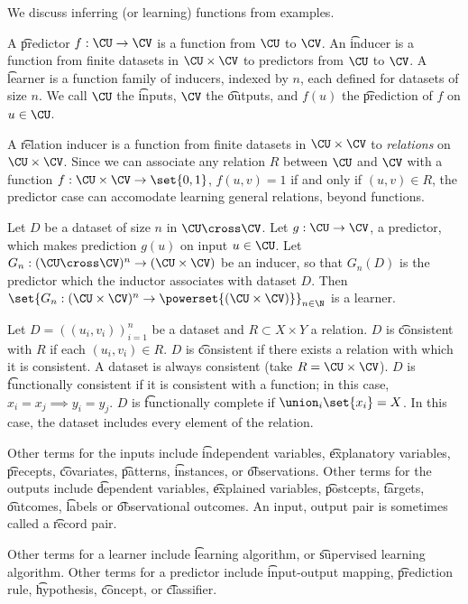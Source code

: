 
We discuss inferring (or learning) functions from examples.

A \t{predictor} $f: \CU \to \CV$ is a function from $\CU$ to $\CV$.
An \t{inducer} is a function from finite datasets in $\CU \times \CV$ to predictors from $\CU$ to $\CV$.
A \t{learner} is a function family of inducers, indexed by $n$, each defined for datasets of size $n$.
We call $\CU$ the \t{inputs}, $\CV$ the \t{outputs}, and $f(u)$ the \t{prediction} of $f$ on $u \in \CU$.

A \t{relation inducer} is a function from finite datasets in $\CU \times \CV$ to \textit{relations} on $\CU \times \CV$.
Since we can associate any relation $R$ between $\CU$ and $\CV$ with a function $f: \CU \times \CV \to \set{0, 1}$, $f(u, v) = 1$ if and only if $(u, v) \in R$, the predictor case can accomodate learning general relations, beyond functions.


Let $D$ be a dataset of size $n$ in $\CU \cross \CV$.
Let $g: \CU \to \CV$, a predictor, which makes prediction $g(u)$ on input $u \in \CU$.
Let $G_n: (\CU \cross \CV)^n \to (\CU \times \CV)$ be an inducer, so that $G_n(D)$ is the predictor which the inductor associates with dataset $D$.
Then $\set{G_n: (\CU \times \CV)^n \to \powerset{(\CU \times \CV)}}_{n \in \N}$ is a learner.


Let $D = ((u_i, v_i))_{i = 1}^{n}$ be a dataset and $R \subset X \times Y$ a relation.
$D$ is \t{consistent with $R$} if each $(u_i, v_i) \in R$.
$D$ is \t{consistent} if there exists a relation with which it is consistent.
A dataset is always consistent (take $R = \CU \times \CV$).
$D$ is \t{functionally consistent} if it is consistent with a function; in this case, $x_i = x_j \implies y_i = y_j$.
$D$ is \t{functionally complete} if $\union_i\set{x_i} = X$.
In this case, the dataset includes every element of the relation.


Other terms for the inputs include \t{independent variables}, \t{explanatory variables}, \t{precepts}, \t{covariates}, \t{patterns}, \t{instances}, or \t{observations}.
Other terms for the outputs include \t{dependent variables}, \t{explained variables}, \t{postcepts}, \t{targets}, \t{outcomes}, \t{labels} or \t{observational outcomes}.
An input, output pair is sometimes called a \t{record pair}.

Other terms for a learner include \t{learning algorithm}, or \t{supervised learning algorithm}.
Other terms for a predictor include \t{input-output} mapping, \t{prediction rule}, \t{hypothesis}, \t{concept}, or \t{classifier}.

